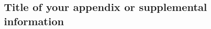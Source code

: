 \documentclass[12pt]{report}
\begin{document}
\begin{justify}
\begin{appendices}
    \chapter{Title of your appendix or supplemental information}
        \label{appendix:short_name_for_ref_command}
        
%       
%       
\end{appendices}

\end{justify}
\end{document}

